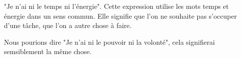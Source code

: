 "Je n'ai ni le temps ni l'énergie". Cette expression utilise les mots temps et énergie dans un sens commun. Elle signifie que l'on ne souhaite pas s'occuper d'une tâche, que l'on a autre chose à faire.

Nous pourions dire "Je n'ai ni le pouvoir ni la volonté", cela signifierai semsiblement la même chose.
